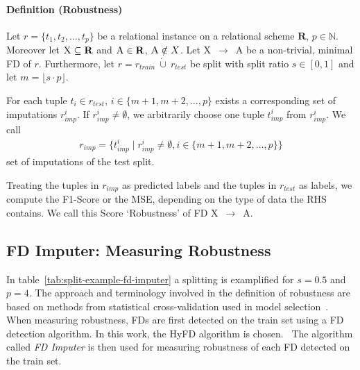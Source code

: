 \paragraph{Definition (Robustness)}
Let \( r = \{ t_1, t_2, \dots, t_p \}\) be a relational instance on a relational scheme \( \mathbf{R} \), \( p \in \mathbb{N} \).
Moreover let \( \textsc{X} \subseteq \mathbf{R} \) and \( \textsc{A} \in \mathbf{R} \), \( \textsc{A} \notin X\).
Let \textsc{X}~\( \rightarrow \)~\textsc{A} be a non-trivial, minimal FD of \( r \).
Furthermore, let \( r = r_{train}~\dot\cup~r_{test} \) be split with split ratio \( s \in [0, 1] \) and let \( m = \lfloor s \cdot p \rfloor \).

For each tuple \( t_i \in r_{test} \), \( i \in \{ m + 1, m + 2, \dots, p \} \) exists a corresponding set of imputations \( r_{imp}^i \).
If \( r_{imp}^i \neq \emptyset \), we arbitrarily choose one tuple \( t_{imp}^{i} \) from \( r_{imp}^i \).
We call
\begin{align}\label{eq:imputation-set}
    r_{imp} = \{ t_{imp}^{i} \mid  r_{imp}^i \neq \emptyset, i \in \{ m + 1, m + 2, \dots, p \} \}
\end{align}
set of imputations of the test split.

Treating the tuples in \( r_{imp} \) as predicted labels and the tuples in \( r_{test} \) as labels, we compute the F1-Score or the MSE, depending on the type of data the RHS contains.
We call this Score `Robustness' of FD \textsc{X}~\( \rightarrow \)~\textsc{A}.


\subsection{FD Imputer: Measuring Robustness}
In table~\ref{tab:split-example-fd-imputer} a splitting is examplified for \( s = 0.5 \) and \( p=4 \).
The approach and terminology involved in the definition of robustness are based on methods from statistical cross-validation used in model selection~\cite[p.~172]{HAY09}.
When measuring robustness, FDs are first detected on the train set using a FD detection algorithm.
In this work, the HyFD algorithm is chosen.~\cite{PAP16}
The algorithm called \emph{FD Imputer} is then used for measuring robustness of each FD detected on the train set.

